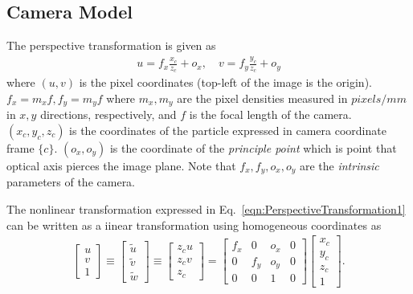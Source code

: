 \documentclass{report}
\begin{document}
\subsection{Camera Model}
\hspace{\parindent}The perspective transformation is given as
\begin{align}
	u = f_x \frac{x_c}{z_c} + o_x, \quad v = f_y \frac{y_c}{z_c} + o_y
	\label{eqn:PerspectiveTransformation1}
\end{align}
where $(u, v)$ is the pixel coordinates (top-left of the image is the origin). $f_x = m_x f, f_y = m_y f$ where $m_x, m_y$ are the pixel densities measured in $pixels / mm$ in $x, y$ directions, respectively, and $f$ is the focal length of the camera. $(x_c, y_c, z_c)$ is the coordinates of the particle expressed in camera coordinate frame $\{c\}$. $(o_x, o_y)$ is the coordinate of the \textit{principle point} which is point that optical axis pierces the image plane. Note that $f_x, f_y, o_x, o_y$ are the \textit{intrinsic} parameters of the camera.

The nonlinear transformation expressed in Eq.~\ref{eqn:PerspectiveTransformation1} can be written as a iinear transformation using homogeneous coordinates as
\begin{align}
	\begin{bmatrix}
		u \\
		v \\
		1
	\end{bmatrix}
	\equiv
	\begin{bmatrix}
		\tilde{u} \\
		\tilde{v} \\
		\tilde{w}
	\end{bmatrix}
	\equiv
	\begin{bmatrix}
		z_c u \\
		z_c v \\
		z_c
	\end{bmatrix}
	=
	\begin{bmatrix}
		f_x & 0 & o_x & 0 \\
		0 & f_y & o_y & 0 \\
		0 & 0 & 1 & 0
	\end{bmatrix}
	\begin{bmatrix}
		x_c \\
		y_c \\
		z_c \\
		1
	\end{bmatrix}.
	\label{eqn:PerspectiveTransformation2}
\end{align}
\end{document}
